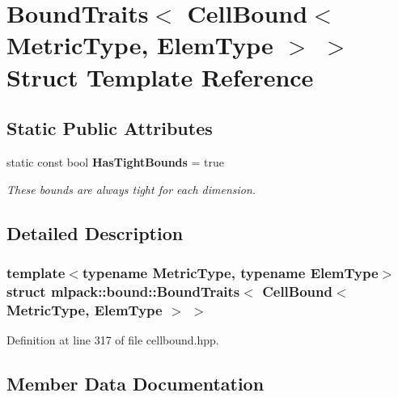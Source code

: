 \section{Bound\+Traits$<$ Cell\+Bound$<$ Metric\+Type, Elem\+Type $>$ $>$ Struct Template Reference}
\label{structmlpack_1_1bound_1_1BoundTraits_3_01CellBound_3_01MetricType_00_01ElemType_01_4_01_4}
\subsection*{Static Public Attributes}
\begin{DoxyCompactItemize}
\item 
static const bool \textbf{ Has\+Tight\+Bounds} = true
\begin{DoxyCompactList}\small\item\em These bounds are always tight for each dimension. \end{DoxyCompactList}\end{DoxyCompactItemize}


\subsection{Detailed Description}
\subsubsection*{template$<$typename Metric\+Type, typename Elem\+Type$>$\newline
struct mlpack\+::bound\+::\+Bound\+Traits$<$ Cell\+Bound$<$ Metric\+Type, Elem\+Type $>$ $>$}



Definition at line 317 of file cellbound.\+hpp.



\subsection{Member Data Documentation}
\mbox{\label{structmlpack_1_1bound_1_1BoundTraits_3_01CellBound_3_01MetricType_00_01ElemType_01_4_01_4_af41e456bf5ea6c0557730318fe660d2d}} 

